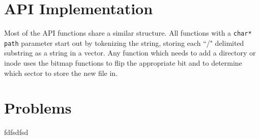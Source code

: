 \documentclass[]{article}
\begin{document}


\section{API Implementation}
Most of the API functions share a similar structure. All functions with a \texttt{char* path} parameter start out by tokenizing the string, storing each ``/" delimited substring as a string in a vector. Any function which needs to add a directory or inode uses the bitmap functions to flip the appropriate bit and to determine which sector to store the new file in.

\section{Problems} \label{sec:problems}
fdfsdfsd
\end{document}
